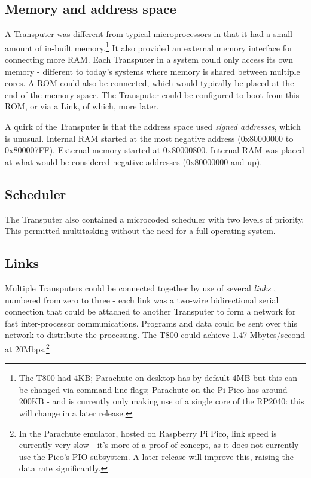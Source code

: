 \documentclass[a4paper]{tufte-book}
\begin{document}
\subsection{Memory and address space}
A Transputer was different from typical microprocessors in that it had a small amount of in-built memory.\footnote{The T800 had 4KB; Parachute on desktop has by default 4MB but this can be changed via command line flags; Parachute on the Pi Pico has around 200KB - and is currently only making use of a single core of the RP2040: this will change in a later release.} It also provided an external memory interface for connecting more RAM. Each Transputer in a system could only access its own memory - different to today's systems where memory is shared between multiple cores. A ROM could also be connected, which would typically be placed at the end of the memory space. The Transputer could be configured to boot from this ROM, or via a Link, of which, more later. 

A quirk of the Transputer is that the address space used \textit{signed addresses}, which is unusual. Internal RAM started at the most negative address (0x80000000 to 0x800007FF). External memory started at 0x80000800. Internal RAM was placed at what would be considered negative addresses (0x80000000 and up).

\subsection{Scheduler}
The Transputer also contained a microcoded scheduler with two levels of priority. This permitted multitasking without the need for a full operating system.

\subsection{Links}
Multiple Transputers could be connected together by use of several \textit{links} , numbered from zero to three - each link was a two-wire bidirectional serial connection that could be attached to another Transputer to form a network for fast inter-processor communications. Programs and data could be sent over this network to distribute the processing. The T800 could achieve 1.47 Mbytes/second at 20Mbps.\footnote{In the Parachute emulator, hosted on Raspberry Pi Pico, link speed is currently very slow - it's more of a proof of concept, as it does not currently use the Pico's PIO subsystem. A later release will improve this, raising the data rate significantly.} 
\end{document}
